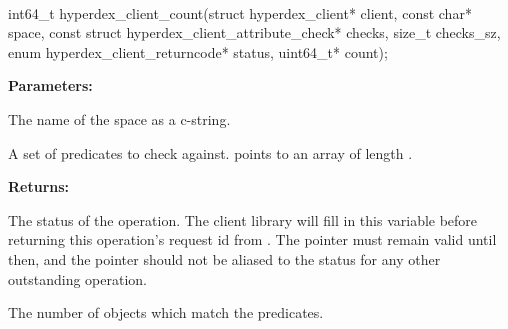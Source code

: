 \paragraph{}
\label{api:c:count}
\begin{ccode}
int64_t hyperdex_client_count(struct hyperdex_client* client,
        const char* space,
        const struct hyperdex_client_attribute_check* checks, size_t checks_sz,
        enum hyperdex_client_returncode* status,
        uint64_t* count);
\end{ccode}
\funcdesc 

\noindent\textbf{Parameters:}
\begin{description}[labelindent=\widthof{{\code{checks}, \code{checks\_sz}}},leftmargin=*,noitemsep,nolistsep,align=right]
\item[\code{space}] The name of the space as a c-string.
\item[\code{checks}, \code{checks\_sz}] A set of predicates to check against.   points to an array of length .
\end{description}

\noindent\textbf{Returns:}
\begin{description}[labelindent=\widthof{{\code{status}}},leftmargin=*,noitemsep,nolistsep,align=right]
\item[\code{status}] The status of the operation.  The client library will fill in this variable before returning this operation's request id from .  The pointer must remain valid until then, and the pointer should not be aliased to the status for any other outstanding operation.
\item[\code{count}] The number of objects which match the predicates.
\end{description}
